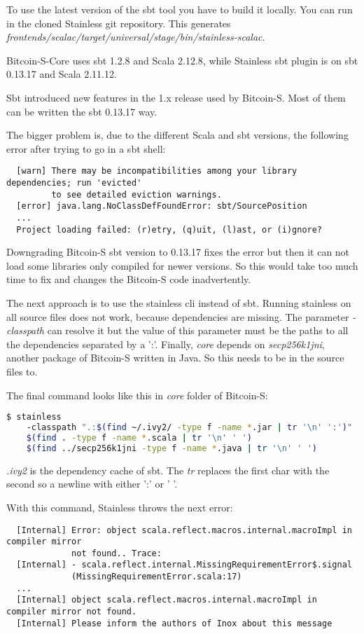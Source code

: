 To use the latest version of the sbt tool you have to build it locally.
You can run  in the cloned Stainless git repository.
This generates \emph{frontends/scalac/target/universal/stage/bin/stainless-scalac}.

Bitcoin-S-Core uses sbt 1.2.8 and Scala 2.12.8, while Stainless sbt plugin is on sbt 0.13.17 and Scala 2.11.12.

Sbt introduced new features in the 1.x release used by Bitcoin-S.
Most of them can be written the sbt 0.13.17 way.

The bigger problem is, due to the different Scala and sbt versions, the following error after trying to go in a sbt shell:
\begin{verbatim}
  [warn] There may be incompatibilities among your library dependencies; run 'evicted'
         to see detailed eviction warnings.
  [error] java.lang.NoClassDefFoundError: sbt/SourcePosition
  ...
  Project loading failed: (r)etry, (q)uit, (l)ast, or (i)gnore?
\end{verbatim}

Downgrading Bitcoin-S sbt version to 0.13.17 fixes the error but then it can not load some libraries only compiled for newer versions.
So this would take too much time to fix and changes the Bitcoin-S code inadvertently.

The next approach is to use the stainless cli instead of sbt.
Running stainless on all source files does not work, because dependencies are missing.
The parameter \emph{-classpath} can resolve it but the value of this parameter must be the paths to all the dependencies separated by a ':'.
Finally, \emph{core} depends on \emph{secp256k1jni}, another package of Bitcoin-S written in Java.
So this needs to be in the source files to.

The final command looks like this in \emph{core} folder of Bitcoin-S:
\begin{lstlisting}[language=bash]
  $ stainless
    -classpath ".:$(find ~/.ivy2/ -type f -name *.jar | tr '\n' ':')"
    $(find . -type f -name *.scala | tr '\n' ' ')
    $(find ../secp256k1jni -type f -name *.java | tr '\n' ' ')
\end{lstlisting}

\emph{.ivy2} is the dependency cache of sbt.
The \emph{tr} replaces the first char with the second so a newline with either ':' or ' '.

With this command, Stainless throws the next error:
\begin{verbatim}
  [Internal] Error: object scala.reflect.macros.internal.macroImpl in compiler mirror
             not found.. Trace:
  [Internal] - scala.reflect.internal.MissingRequirementError$.signal
             (MissingRequirementError.scala:17)
  ...
  [Internal] object scala.reflect.macros.internal.macroImpl in compiler mirror not found.
  [Internal] Please inform the authors of Inox about this message
\end{verbatim}

